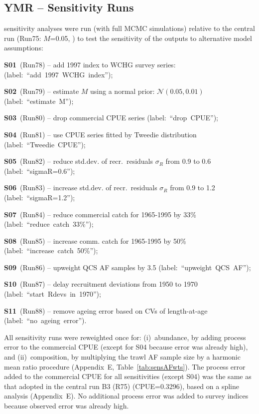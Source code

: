 \documentclass[11pt]{book}
\newcommand{\AppEqn}{Appendix~E}
\newcommand{\pc}{\%}
\begin{document}
\subsection{YMR -- Sensitivity Runs}\label{ss:sensruns} 


 sensitivity analyses were run (with full MCMC simulations) relative to the central run (Run75: $M$=0.05, ) to test the sensitivity of the outputs to alternative model assumptions:
\vspace{-0.5\baselineskip}%
\begin{itemize_csas}
  \item \textbf{S01}~(Run78)  -- add 1997 index to WCHG survey series: (label:~``add~1997~WCHG~index'');
  \item \textbf{S02}~(Run79)  -- estimate $M$ using a normal prior: $\mathcal{N}(0.05,0.01)$ (label:~``estimate~M'');
  \item \textbf{S03}~(Run80)  -- drop commercial CPUE series  (label:~``drop~CPUE'');
  \item \textbf{S04}~(Run81)  -- use CPUE series fitted by Tweedie distribution (label:~``Tweedie~CPUE'');
  \item \textbf{S05}~(Run82)  -- reduce std.dev. of recr.~residuals $\sigma_R$ from 0.9 to 0.6  (label:~``sigmaR=0.6'');
  \item \textbf{S06}~(Run83)  -- increase std.dev. of recr.~residuals $\sigma_R$ from 0.9 to 1.2 (label:~``sigmaR=1.2'');
  \item \textbf{S07}~(Run84)  -- reduce commercial catch for 1965-1995 by 33\pc{} (label:~``reduce~catch~33\%'');
  \item \textbf{S08}~(Run85)  -- increase comm. catch for 1965-1995 by 50\pc{} (label:~``increase~catch~50\%'');
  \item \textbf{S09}~(Run86)  -- upweight QCS AF samples by 3.5 (label:~``upweight~QCS~AF'');
  \item \textbf{S10}~(Run87) -- delay recruitment deviations from 1950 to 1970 (label:~``start~Rdevs~in~1970'');
  \item \textbf{S11}~(Run88) -- remove ageing error based on CVs of length-at-age (label:~``no~ageing~error'').
\end{itemize_csas}

All sensitivity runs were reweighted once for: (i)~abundance, by adding process error to the commercial CPUE (except for S04 because error was already high), and (ii)~composition, by multiplying the trawl AF sample size by a harmonic mean ratio procedure (\AppEqn, Table~\ref{tab:sensAFwts}).
The process error added to the commercial CPUE for all sensitivities (except S04) was the same as that adopted in the central run B3 (R75) (CPUE=0.3296), based on a spline analysis (\AppEqn).
No additional process error was added to survey indices because observed error was already high.
\end{document}
